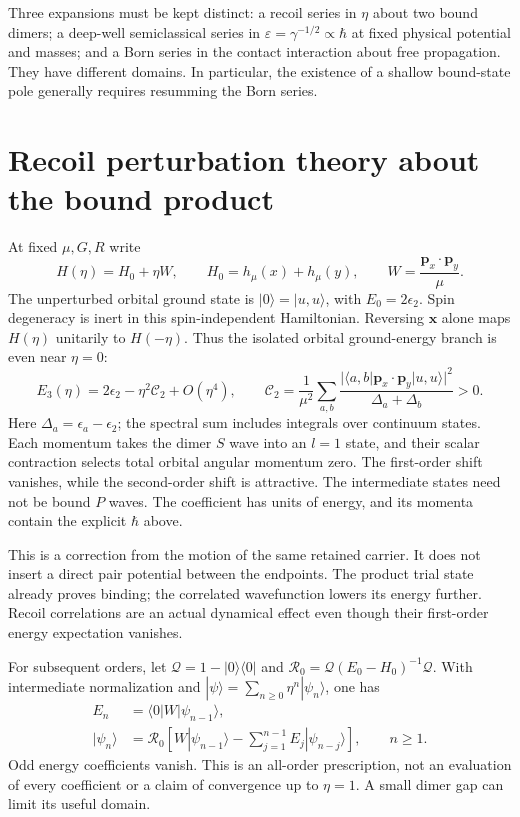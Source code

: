 Three expansions must be kept distinct: a recoil series in $\eta$ about two bound dimers; a deep-well semiclassical series in
$\varepsilon=\gamma^{-1/2}\propto\hbar$ at fixed physical potential and masses; and a Born series in the contact interaction about free propagation. They have different domains. In particular, the existence of a shallow bound-state pole generally requires resumming the Born series.

\section{Recoil perturbation theory about the bound product}
\label{sec:recoil}
At fixed $\mu,G,R$ write
\begin{equation}
 H(\eta)=H_0+\eta W,\qquad
 H_0=h_\mu(x)+h_\mu(y),\qquad
 W=\frac{\mathbf p_x\cdot\mathbf p_y}{\mu}.
\end{equation}
The unperturbed orbital ground state is $|0\rangle=|u,u\rangle$, with $E_0=2\epsilon_2$. Spin degeneracy is inert in this spin-independent Hamiltonian. Reversing $\mathbf x$ alone maps $H(\eta)$ unitarily to $H(-\eta)$. Thus the isolated orbital ground-energy branch is even near $\eta=0$:
\begin{equation}
 E_3(\eta)=2\epsilon_2-\eta^2\mathcal C_2+O(\eta^4),\qquad
 \mathcal C_2=
 \frac{1}{\mu^2}\sum_{a,b}
 \frac{|\langle a,b|\mathbf p_x\cdot\mathbf p_y|u,u\rangle|^2}
      {\Delta_a+\Delta_b}>0.
 \label{eq:recoil-second}
\end{equation}
Here $\Delta_a=\epsilon_a-\epsilon_2$; the spectral sum includes integrals over continuum states. Each momentum takes the dimer $S$ wave into an $l=1$ state, and their scalar contraction selects total orbital angular momentum zero. The first-order shift vanishes, while the second-order shift is attractive. The intermediate states need not be bound $P$ waves. The coefficient has units of energy, and its momenta contain the explicit $\hbar$ above.

This is a correction from the motion of the same retained carrier. It does not insert a direct pair potential between the endpoints. The product trial state already proves binding; the correlated wavefunction lowers its energy further. Recoil correlations are an actual dynamical effect even though their first-order energy expectation vanishes.

For subsequent orders, let $\mathcal Q=1-|0\rangle\langle0|$ and
$\mathcal R_0=\mathcal Q(E_0-H_0)^{-1}\mathcal Q$.
With intermediate normalization and
$|\psi\rangle=\sum_{n\geq0}\eta^n|\psi_n\rangle$, one has
\begin{align}
 E_n&=\langle0|W|\psi_{n-1}\rangle,\\
 |\psi_n\rangle&=\mathcal R_0\left[
 W|\psi_{n-1}\rangle-\sum_{j=1}^{n-1}E_j|\psi_{n-j}\rangle
 \right],\qquad n\geq1 .
 \label{eq:recursion}
\end{align}
Odd energy coefficients vanish. This is an all-order prescription, not an evaluation of every coefficient or a claim of convergence up to $\eta=1$. A small dimer gap can limit its useful domain.


